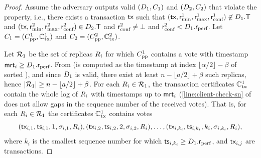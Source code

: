 \begin{proof}
	Assume the adversary outputs valid $(D_1, C_1)$ and $(D_2, C_2)$ that violate the property,
	i.e., there exists a transaction $\textsf{tx}$ such that $(\textsf{tx}, \textsf{r}_\text{min}^1, \textsf{r}_\text{max}^1, \textsf{r}_\text{conf}^1) \not\in D_1.\textsf{T}$ and $(\textsf{tx}, \textsf{r}_\text{min}^2, \textsf{r}_\text{max}^2, \textsf{r}_\text{conf}^2) \in D_2.\textsf{T}$ and $\textsf{r}_\text{conf}^2 \neq \bot$ and $\textsf{r}_\text{conf}^2 < D_1.\textsf{r}_\text{perf}$.
	Let $C_1 = (C_\text{pp}^1, \mathbb{C}_\text{tx}^1)$ and $C_2 = (C_\text{pp}^2, \mathbb{C}_\text{tx}^2)$.

	Let $\mathcal{R}_1$ be the set of replicas $R_i$ for which $C_\text{pp}^1$ contains a vote with timestamp $\textsf{mrt}_i \geq D_1.\textsf{r}_\text{perf}$.
	From  (\rperf is computed as the timestamp at index $\lfloor \alpha / 2 \rfloor - \beta$ of sorted \mrt), and since $D_1$ is valid, there exist at least $n - \lfloor a/2 \rfloor + \beta$ such replicas, hence $|\allreps_1| \geq n - \lfloor a/2 \rfloor + \beta$.
	For each $R_i \in \mathcal{R}_1$, the transaction certificates $\mathbb{C}_\text{tx}^1$ contain the whole log of $R_i$ with timestamps up to $\textsf{mrt}_i$ (\cref{line:client-check-sn} of  does not allow gaps in the sequence number of the received votes).
	That is, for each $R_i \in \mathcal{R}_1$ the certificates $\mathbb{C}_\text{tx}^1$ contains votes
	\begin{equation}\label{eq:proof-pp-set1}
		(\textsf{tx}_{i,1}, \textsf{ts}_{i,1}, 1, \sigma_{i,1}, R_i), (\textsf{tx}_{i,2}, \textsf{ts}_{i,2}, 2, \sigma_{i,2}, R_i), \ldots, (\textsf{tx}_{i,k_i}, \textsf{ts}_{i, k_i}, k_i, \sigma_{i, k_i}, R_i),
	\end{equation}
	where $k_i$ is the smallest sequence number for which $\textsf{ts}_{i, k_i} \geq D_1.\textsf{r}_\text{perf}$, and $\textsf{tx}_{i,j}$ are transactions.


\end{proof}
